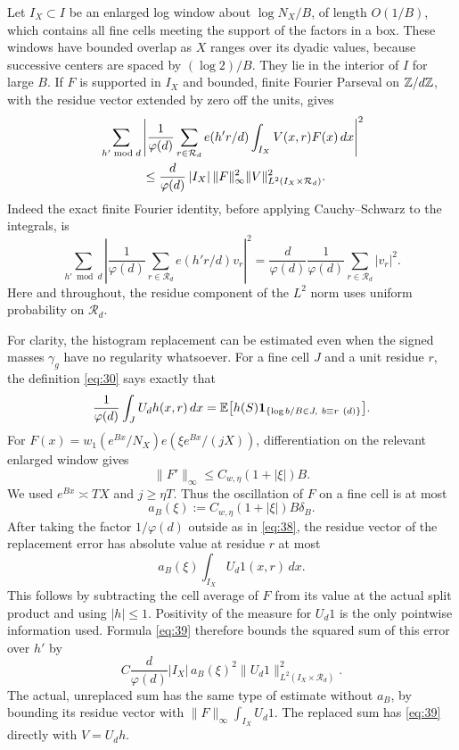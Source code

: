 Let \(I_X\subset I\) be an enlarged log window about
\(\log N_X/B\), of length \(O(1/B)\), which contains all fine cells
meeting the support of the factors in a box.  These windows have
bounded overlap as \(X\) ranges over its dyadic values, because
successive centers are spaced by \((\log2)/B\).  They lie in the
interior of \(I\) for large \(B\).  If \(F\) is supported in
\(I_X\) and bounded, finite Fourier Parseval on \(\mathbb Z/d\mathbb Z\), with
the residue vector extended by zero off the units, gives
\begin{equation}\label{eq:39}
 \begin{split}
 &\sum_{h'\bmod d}\left|
  \frac1{\varphi(d)}\sum_{r\in\mathcal R_d}e(h'r/d)
                    \int_{I_X}V(x,r)F(x)\,dx\right|^2\\
 &\hspace{12mm}\le
  \frac d{\varphi(d)}\,|I_X|\,\|F\|_\infty^2
             \|V\|_{L^2(I_X\times\mathcal R_d)}^2.
 \end{split}
\end{equation}
Indeed the exact finite Fourier identity, before applying
Cauchy--Schwarz to the integrals, is
\[
 \sum_{h'\bmod d}
 \left|\frac1{\varphi(d)}\sum_{r\in\mathcal R_d}e(h'r/d)v_r\right|^2
 =\frac d{\varphi(d)}\frac1{\varphi(d)}
                    \sum_{r\in\mathcal R_d}|v_r|^2.
\]
Here and throughout, the residue component of the \(L^2\) norm uses
uniform probability on \(\mathcal R_d\).

For clarity, the histogram replacement can be estimated even when
the signed masses \(\gamma_g\) have no regularity whatsoever.
For a fine cell \(J\) and a unit residue \(r\), the definition
\eqref{eq:30} says exactly that
\[
 \frac1{\varphi(d)}\int_J U_dh(x,r)\,dx
 =\mathbb E\big[h(S)\mathbf 1_{\{\log b/B\in J,\ b\equiv r\ (d)\}}\big].
\]
For
\(F(x)=w_1(e^{Bx}/N_X)e(\xi e^{Bx}/(jX))\), differentiation on the
relevant enlarged window gives
\[
 \|F'\|_\infty\le C_{w,\eta}(1+|\xi|)B.
\]
We used \(e^{Bx}\asymp TX\) and \(j\ge\eta T\).  Thus the
oscillation of \(F\) on a fine cell is at most
\[
 a_B(\xi):=C_{w,\eta}(1+|\xi|)B\delta_B.
\]
After taking the factor \(1/\varphi(d)\) outside as in
\eqref{eq:38}, the residue vector of the replacement error has
absolute value at residue \(r\) at most
\[
 a_B(\xi)\int_{I_X}U_d1(x,r)\,dx.
\]
This follows by subtracting the cell average of \(F\) from its value
at the actual split product and using
\(\lvert h\rvert\le1\).  Positivity of the measure for \(U_d1\)
is the only pointwise information used.  Formula \eqref{eq:39}
therefore bounds the squared sum of this error over \(h'\) by
\[
 C\frac d{\varphi(d)}|I_X|\,a_B(\xi)^2
          \|U_d1\|_{L^2(I_X\times\mathcal R_d)}^2.
\]
The actual, unreplaced sum has the same type of estimate without
\(a_B\), by bounding its residue vector with
\(\|F\|_\infty\int_{I_X}U_d1\).  The replaced sum has
\eqref{eq:39} directly with \(V=U_dh\).

